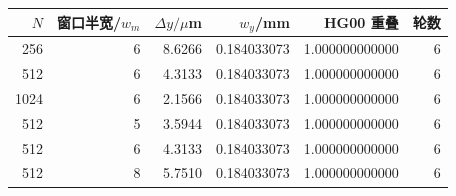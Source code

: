 \begin{tabular}{rrrrrr}\toprule
$N$ & 窗口半宽/$w_m$ & $\Delta y/\mu$m & $w_y$/mm & HG00 重叠 & 轮数\\\midrule
256 & 6 & 8.6266 & 0.184033073 & 1.000000000000 & 6\\
512 & 6 & 4.3133 & 0.184033073 & 1.000000000000 & 6\\
1024 & 6 & 2.1566 & 0.184033073 & 1.000000000000 & 6\\
512 & 5 & 3.5944 & 0.184033073 & 1.000000000000 & 6\\
512 & 6 & 4.3133 & 0.184033073 & 1.000000000000 & 6\\
512 & 8 & 5.7510 & 0.184033073 & 1.000000000000 & 6\\
\bottomrule\end{tabular}